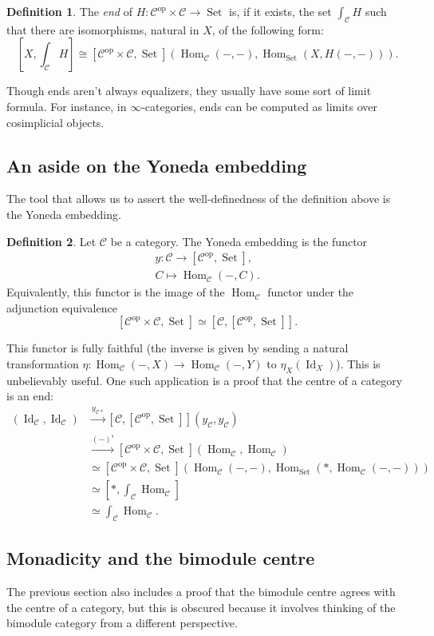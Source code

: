 \documentclass{article}
\newcommand{\C}{\mathcal{C}}
\newcommand{\op}{{\tempop}}
\DeclareMathOperator{\Hom}{Hom}
\DeclareMathOperator{\Id}{Id}
\DeclareMathOperator{\Set}{Set}
\DeclareMathOperator{\tempop}{op}
\theoremstyle{definition}
\newtheorem{definition}{Definition}
\begin{document}
\begin{definition}
  The \textit{end} of $H : \C^\op \times \C \to \Set$ is, if it exists, the set $\int_{\C} H$ such that there are isomorphisms, natural in $X$, of the following form:
  \[
    \left[ X, \int_{\C} H \right]
    \cong [\C^\op \times \C, \Set](\Hom_\C(-, -), \Hom_{\Set}(X, H(-, -))).
  \]
\end{definition}
Though ends aren't always equalizers, they usually have some sort of limit formula.
For instance, in $\infty$-categories, ends can be computed as limits over cosimplicial objects.

\subsection{An aside on the Yoneda embedding}
The tool that allows us to assert the well-definedness of the definition above is the Yoneda embedding.

\begin{definition}
  Let $\C$ be a category.
  The Yoneda embedding is the functor
  \begin{gather*}
    y : \C \to [\C^\op, \Set],\\
    C \mapsto \Hom_\C(-, C).
  \end{gather*}
  Equivalently, this functor is the image of the $\Hom_\C$ functor under the adjunction equivalence
  \[ [\C^\op \times \C, \Set] \simeq [\C, [\C^\op, \Set]]. \]
\end{definition}

This functor is fully faithful (the inverse is given by sending a natural transformation $\eta : \Hom_\C(-, X) \to \Hom_\C(-, Y)$ to $\eta_X(\Id_X)$).
This is unbelievably useful.
One such application is a proof that the centre of a category is an end:
\begin{align*}
  [\C, \C](\Id_\C, \Id_\C)
  &\xrightarrow{y_{\C\ast}} [\C, [\C^\op, \Set]](y_\C, y_\C)\\
  &\xrightarrow{(-)^\flat} [\C^\op \times \C, \Set](\Hom_\C, \Hom_\C)\\
  &\simeq [\C^\op \times \C, \Set](\Hom_\C(-, -), \Hom_{\Set}(*, \Hom_\C(-, -)))\\
  &\simeq \left[\ast, \int_\C \Hom_\C \right]\\
  &\simeq \int_\C \Hom_\C.
\end{align*}

\subsection{Monadicity and the bimodule centre}
The previous section also includes a proof that the bimodule centre agrees with the centre of a category, but this is obscured because it involves thinking of the bimodule category from a different perspective.
\end{document}
